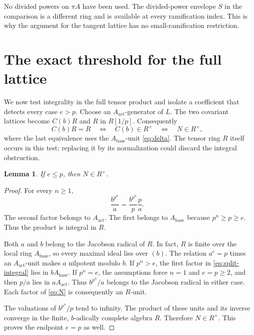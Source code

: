 \documentclass[11pt]{article}
\newtheorem{lemma}[theorem]{Lemma}
\theoremstyle{definition}\newtheorem{definition}[theorem]{Definition}
\theoremstyle{remark}\newtheorem{remark}[theorem]{Remark}
\newcommand{\act}{\mathrm{act}}
\newcommand{\base}{\mathrm{base}}
\begin{document}
No divided powers on $\pi A$ have been used. The divided-power envelope $S$ in the comparison is a different ring and is available at every ramification index. This is why the argument for the tangent lattice has no small-ramification restriction.

\section{The exact threshold for the full lattice}\label{sec:threshold}

We now test integrality in the full tensor product and isolate a coefficient that detects every case $e>p$. Choose an $A_{\act}$-generator of $L$. The two covariant lattices become $C(b)R$ and $R$ in $R[1/p]$. Consequently
\begin{equation}\label{eq:unit-test}
 C(b)R=R
 \quad\Longleftrightarrow\quad C(b)\in R^\times
 \quad\Longleftrightarrow\quad N\in R^\times,
\end{equation}
where the last equivalence uses the $A_{\base}$-unit \eqref{eq:delta}. The tensor ring $R$ itself occurs in this test; replacing it by its normalization could discard the integral obstruction.

\begin{lemma}\label{lem:sufficiency}
If $e\le p$, then $N\in R^\times$.
\end{lemma}

\begin{proof}
For every $n\ge1$,
\begin{equation}\label{eq:split-integral}
 \frac{b^{p^n}}a=\frac{b^{p^n}}p\frac pa.
\end{equation}
The second factor belongs to $A_{\act}$. The first belongs to $A_{\base}$ because $p^n\ge p\ge e$. Thus the product is integral in $R$.

Both $a$ and $b$ belong to the Jacobson radical of $R$. In fact, $R$ is finite over the local ring $A_{\base}$, so every maximal ideal lies over $(b)$. The relation $a^e=p$ times an $A_{\act}$-unit makes $a$ nilpotent modulo $b$. If $p^n>e$, the first factor in \eqref{eq:split-integral} lies in $bA_{\base}$. If $p^n=e$, the assumptions force $n=1$ and $e=p\ge2$, and then $p/a$ lies in $aA_{\act}$. Thus $b^{p^n}/a$ belongs to the Jacobson radical in either case. Each factor of \eqref{eq:N} is consequently an $R$-unit.

The valuations of $b^{p^n}/p$ tend to infinity. The product of these units and its inverse converge in the finite, $b$-adically complete algebra $R$. Therefore $N\in R^\times$. This proves the endpoint $e=p$ as well.
\end{proof}
\end{document}
